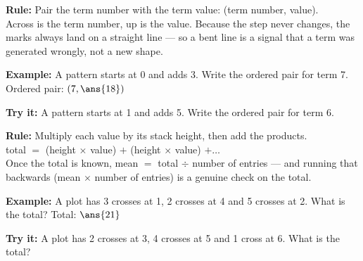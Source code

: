 \documentclass[12pt]{article}
\begin{document}

\begin{formulabox}
\textbf{Rule:} Pair the term number with the term value: (term number, value).\\[3pt]
Across is the term number, up is the value. Because the step never changes, the marks always land on a straight line --- so a bent line is a signal that a term was generated wrongly, not a new shape.
\end{formulabox}

\begin{examplebox}
\textbf{Example:} \quad A pattern starts at 0 and adds 3. Write the ordered pair for term 7.
Ordered pair: $(7, \ans{18})$
\end{examplebox}

\begin{tryitbox}
\textbf{Try it:} \quad A pattern starts at 1 and adds 5. Write the ordered pair for term 6.\\[2pt]
\end{tryitbox}


\begin{formulabox}
\textbf{Rule:} Multiply each value by its stack height, then add the products.\\[3pt]
total $=$ (height $\times$ value) $+$ (height $\times$ value) $+ \ldots$\\[3pt]
Once the total is known, mean $=$ total $\div$ number of entries --- and running that backwards (mean $\times$ number of entries) is a genuine check on the total.
\end{formulabox}

\begin{examplebox}
\textbf{Example:} \quad A plot has 3 crosses at 1, 2 crosses at 4 and 5 crosses at 2. What is the total?
Total: $\ans{21}$
\end{examplebox}

\begin{tryitbox}
\textbf{Try it:} \quad A plot has 2 crosses at 3, 4 crosses at 5 and 1 cross at 6. What is the total?\\[2pt]
\end{tryitbox}
\end{document}
